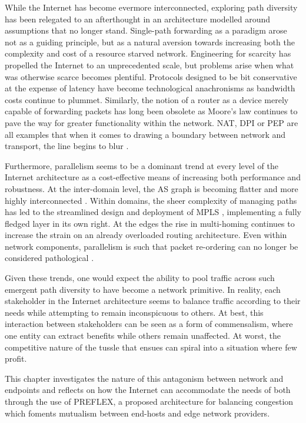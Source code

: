 While the Internet has become evermore interconnected, exploring path diversity has been relegated to an afterthought in an architecture modelled around assumptions that no longer stand. 
Single-path forwarding as a paradigm arose not as a guiding principle, but as a natural aversion towards increasing both the complexity and cost of a resource starved network.
Engineering for scarcity has propelled the Internet to an unprecedented scale, but problems arise when what was otherwise scarce becomes plentiful. 
Protocols designed to be bit conservative at the expense of latency have become technological anachronisms as bandwidth costs continue to plummet. 
Similarly, the notion of a router as a device merely capable of forwarding packets has long been obsolete as Moore's law continues to pave the way for greater functionality within the network. 
\ac{NAT}, \ac{DPI} or \ac{PEP} are all examples that when it comes to drawing a boundary between network and transport, the line begins to blur \cite{Ford:2008p34}.

Furthermore, parallelism seems to be a dominant trend at every level of the Internet architecture as a cost-effective means of increasing both performance and robustness. 
At the inter-domain level, the \ac{AS} graph is becoming flatter and more highly interconnected \cite{Haddadi:2010p129}. 
Within domains, the sheer complexity of managing paths has led to the streamlined design and deployment of \ac{MPLS} \cite{Rosen:2001p147}, implementing a fully fledged layer in its own right. 
At the edges the rise in multi-homing continues to increase the strain on an already overloaded routing architecture. 
Even within network components, parallelism is such that packet re-ordering can no longer be considered pathological \cite{Bennett:1999p120}.

Given these trends, one would expect the ability to pool traffic across such emergent path diversity to have become a network primitive. 
In reality, each stakeholder in the Internet architecture seems to balance traffic according to their needs while attempting to remain inconspicuous to others. 
At best, this interaction between stakeholders can be seen as a form of commensalism, where one entity can extract benefits while others remain unaffected. 
At worst, the competitive nature of the tussle \cite{Clark:2005p67} that ensues can spiral into a situation where few profit.

This chapter investigates the nature of this antagonism between network and endpoints and reflects on how the Internet can accommodate the needs of both through the use of \ac{PREFLEX}, a proposed architecture for balancing congestion which foments mutualism between end-hosts and edge network providers.

